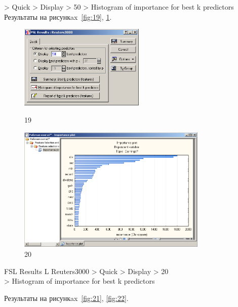 > Quick > Display > 50 > Histogram of importance for best k predictors \\

Результаты на рисункax~\ref{fig:19}, \ref{fig:20}.

\begin{figure}[!h]
  \centering

  \begin{minipage}{0.29\textwidth}
    \centering

    \includegraphics[height=4cm]
    {inc/19.PNG}

    \caption{19}

    \label{fig:19}
  \end{minipage}
  \begin{minipage}{0.69\textwidth}
    \centering

    \includegraphics[height=6cm]
    {inc/20.PNG}

    \caption{20}

    \label{fig:20}
  \end{minipage}
\end{figure}

FSL Results L Reuters3000 > Quick > Display > 20 \\
> Histogram of importance for best k predictors

Результаты на рисункax~\ref{fig:21}, \ref{fig:22}.

